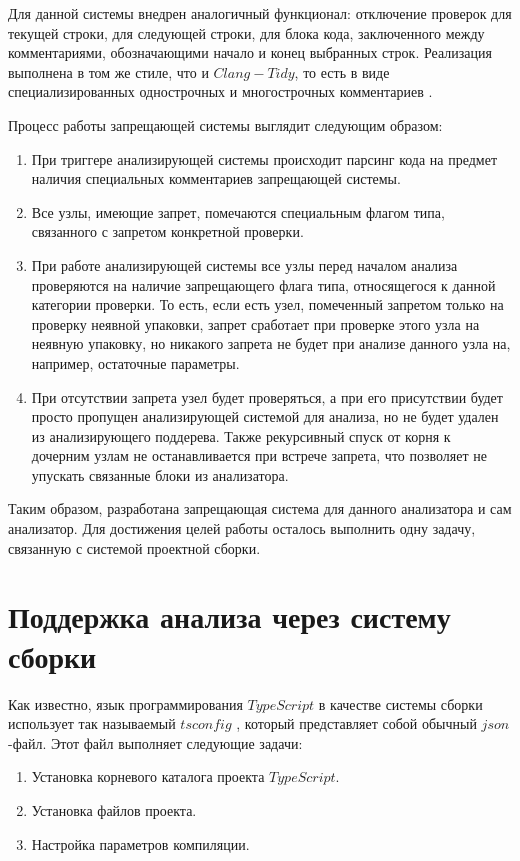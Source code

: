 \documentclass{mipt-thesis-bs}
\begin{document}
Для данной системы внедрен аналогичный функционал: отключение проверок для текущей строки, для
следующей строки, для блока кода, заключенного между комментариями, обозначающими начало и конец
выбранных строк. Реализация выполнена в том же стиле, что и $Clang-Tidy$, то есть в виде
специализированных однострочных и многострочных комментариев \cite{clang-tidy}.

Процесс работы запрещающей системы выглядит следующим образом:
\begin{enumerate}
    \item При триггере анализирующей системы происходит парсинг кода на предмет наличия специальных
    комментариев запрещающей системы.
    \item Все узлы, имеющие запрет, помечаются специальным флагом типа, связанного с запретом конкретной проверки.
    \item При работе анализирующей системы все узлы перед началом анализа проверяются на наличие запрещающего флага типа,
    относящегося к данной категории проверки. То есть, если есть узел, помеченный запретом только на проверку неявной упаковки,
    запрет сработает при проверке этого узла на неявную упаковку, но никакого запрета не будет при анализе данного узла на,
    например, остаточные параметры.
    \item При отсутствии запрета узел будет проверяться, а при его присутствии будет просто пропущен анализирующей системой
    для анализа, но не будет удален из анализирующего поддерева. Также рекурсивный спуск от корня к дочерним узлам не
    останавливается при встрече запрета, что позволяет не упускать связанные блоки из анализатора.
\end{enumerate}

Таким образом, разработана запрещающая система для данного анализатора и сам анализатор. Для достижения целей работы
осталось выполнить одну задачу, связанную с системой проектной сборки.

\section{Поддержка анализа через систему сборки}

Как известно, язык программирования $TypeScript$ в качестве системы сборки использует так называемый
$tsconfig$ \cite{tsspec}, который представляет собой обычный $json$-файл. Этот файл выполняет следующие задачи:

\begin{enumerate}
    \item Установка корневого каталога проекта $TypeScript$.
    \item Установка файлов проекта.
    \item Настройка параметров компиляции.
\end{enumerate}
\end{document}
